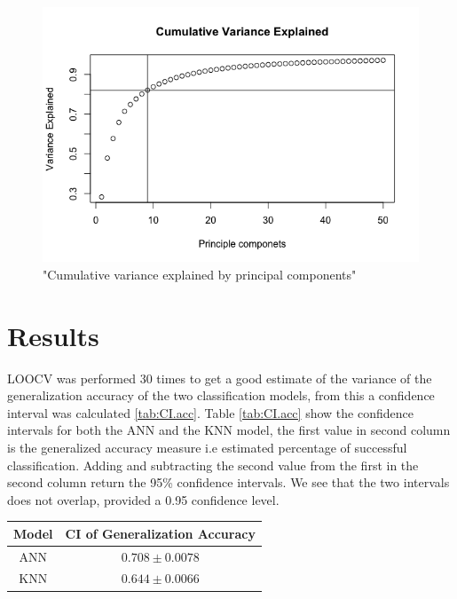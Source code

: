 \documentclass{article}
\begin{document}
\begin{figure}[H]
	\includegraphics[width=\linewidth]{variance_explained.png}
	\caption{"Cumulative variance explained by principal components"}
	\label{fig:varEx}
\end{figure}




\section{Results}
LOOCV was performed 30 times to get a good estimate of the variance of the generalization accuracy of the two classification models, from this a confidence interval was calculated \ref{tab:CI.acc}. Table \ref{tab:CI.acc} show the confidence intervals for both the ANN and the KNN model, the first value in second column is the generalized accuracy measure i.e estimated percentage of successful classification. Adding and subtracting the second value from the first in the second column return the 95\% confidence intervals. We see that the two intervals does not overlap, provided a 0.95 confidence level.\bigskip

\begin{minipage}{\linewidth}
\centering
{} 
\begin{tabular}{ c c}\toprule[2pt]
\bf Model  & \bf CI of Generalization Accuracy \\\midrule[1.5pt]
ANN  & $0.708 \pm 0.0078$  \\\midrule
KNN  & $0.644 \pm 0.0066$ \\
\bottomrule[1.25pt]
\end {tabular}\par
\label{tab:CI.acc}
\end{minipage}\bigskip
\end{document}
